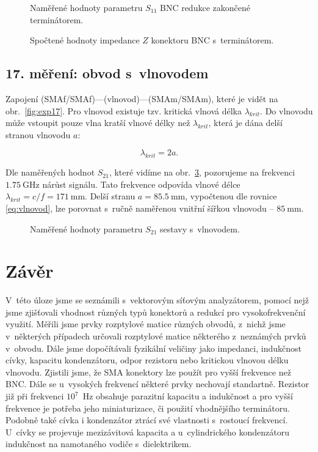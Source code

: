 \documentclass{protokol}
\newcommand\sparam{S}
\newcommand\impedance{Z}
\begin{document}
\begin{figure}[htp]
	\centering
	
	\caption{Naměřené hodnoty parametru $\sparam_{11}$ BNC redukce zakončené 
	terminátorem.}
	\label{fig:16-sparam11}
\end{figure}

\begin{figure}[htp]
	\centering
	
	\caption{Spočtené hodnoty impedance $\impedance$
		konektoru BNC s~terminátorem.}
	\label{fig:16-result-z}
\end{figure}

\subsection{17. měření: obvod s~vlnovodem}
Zapojení (SMAf/SMAf)---(vlnovod)---(SMAm/SMAm), které je vidět na 
obr.~\ref{fig:exp17}. Pro vlnovod existuje tzv. kritická vlnová délka 
$\lambda_{krit}$. Do vlnovodu může vstoupit pouze vlna kratší vlnové délky než 
$\lambda_{krit}$, která je dána delší stranou vlnovodu $a$: 

\begin{equation}
	\lambda_{krit} = 2a.
	\label{eq:vlnovod}
\end{equation}

 Dle naměřených hodnot $\sparam_{21}$, které vidíme na 
 obr.~\ref{fig:17-sparam21}, pozorujeme na frekvenci $\SI{1.75}{\giga\hertz}$ 
 nárůst signálu. Tato frekvence odpovída vlnové délce $\lambda_{krit} = c/f = 
 \SI{171}{\milli\metre}$. Delší stranu $a = \SI{85.5}{\milli\metre}$, 
 vypočtenou dle rovnice \eqref{eq:vlnovod}, lze porovnat s~ručně naměřenou 
 vnitřní šířkou vlnovodu -- $\SI{85}{\milli\metre}$.

\begin{figure}[htp]
	\centering
	
	\caption{Naměřené hodnoty parametru $\sparam_{21}$ sestavy s~vlnovodem.}
	\label{fig:17-sparam21}
\end{figure}

\newpage
\section{Závěr}
V~této úloze jsme se seznámili s~vektorovým síťovým analyzátorem, pomocí nejž 
jsme zjišťovali vhodnost různých typů konektorů a redukcí pro vysokofrekvenční 
využití. Měřili jsme prvky rozptylové matice různých obvodů, z~nichž jsme
v~některých případech určovali rozptylové matice některého z~neznámých prvků
v~obvodu. Dále jsme dopočítávali fyzikální veličiny jako impedanci, indukčnost 
cívky, kapacitu kondenzátoru, odpor rezistoru nebo kritickou vlnovou délku 
vlnovodu.
Zjistili jsme, že SMA konektory lze použít pro vyšší frekvence než BNC. Dále se 
u~vysokých frekvencí některé prvky nechovají standartně. Rezistor již při 
frekvenci $10^7$~Hz obsahuje parazitní kapacitu a indukčnost a pro 
vyšší frekvence je potřeba jeho miniaturizace, či použití vhodnějšího 
terminátoru. Podobně také cívka i kondenzátor ztrácí své vlastnosti s~rostoucí 
frekvencí. U~cívky se projevuje mezizávitová kapacita a u~cylindrického 
kondenzátoru indukčnost na  namotaného vodiče s~dielektrikem.
\newpage
\printbibliography
\end{document}
